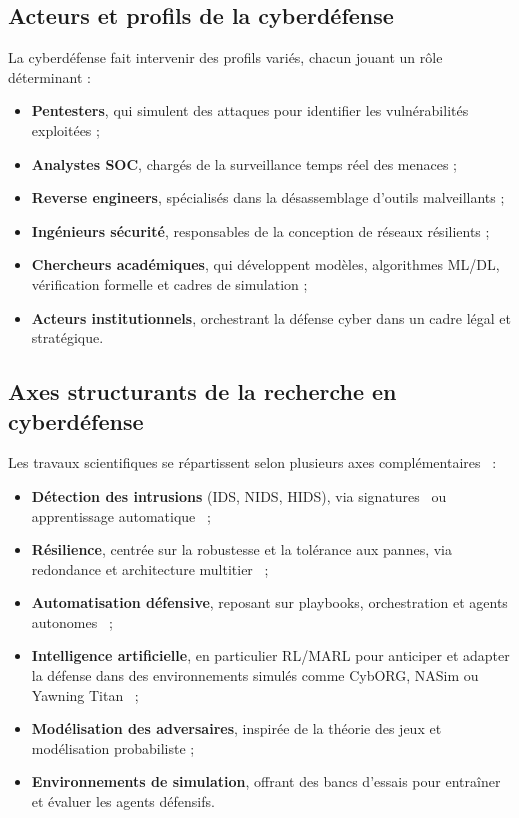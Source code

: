\documentclass[ twoside,openright,titlepage,numbers=noenddot,headinclude,%
                footinclude=true,cleardoublepage=empty,abstractoff, %
                BCOR=5mm,paper=a4,fontsize=11pt,%
                french,american,%
                ]{scrreprt}
\begin{document}
\subsection*{Acteurs et profils de la cyberdéfense}

La cyberdéfense fait intervenir des profils variés, chacun jouant un rôle déterminant :
\begin{itemize}
    \item \textbf{Pentesters}, qui simulent des attaques pour identifier les vulnérabilités exploitées ;
    \item \textbf{Analystes SOC}, chargés de la surveillance temps réel des menaces ;
    \item \textbf{Reverse engineers}, spécialisés dans la désassemblage d'outils malveillants ;
    \item \textbf{Ingénieurs sécurité}, responsables de la conception de réseaux résilients ;
    \item \textbf{Chercheurs académiques}, qui développent modèles, algorithmes ML/DL, vérification formelle et cadres de simulation ;
    \item \textbf{Acteurs institutionnels}, orchestrant la défense cyber dans un cadre légal et stratégique.
\end{itemize}

\subsection*{Axes structurants de la recherche en cyberdéfense}

Les travaux scientifiques se répartissent selon plusieurs axes complémentaires~\cite{Buczak2015} :
\begin{itemize}
    \item \textbf{Détection des intrusions} (IDS, NIDS, HIDS), via signatures~\cite{Axelsson2000} ou apprentissage automatique~\cite{Sommer2010,Buczak2015} ;
    \item \textbf{Résilience}, centrée sur la robustesse et la tolérance aux pannes, via redondance et architecture multitier~\cite{Bodeau2011,MITRECyberResilience2020} ;
    \item \textbf{Automatisation défensive}, reposant sur playbooks, orchestration et agents autonomes~\cite{Pawlick2019autodefense} ;
    \item \textbf{Intelligence artificielle}, en particulier RL/MARL pour anticiper et adapter la défense dans des environnements simulés comme CybORG, NASim ou Yawning Titan~\cite{Standen2021, Ghanem2021NASim,Andrew2022} ;
    \item \textbf{Modélisation des adversaires}, inspirée de la théorie des jeux et modélisation probabiliste ;
    \item \textbf{Environnements de simulation}, offrant des bancs d'essais pour entraîner et évaluer les agents défensifs.
\end{itemize}
\end{document}
